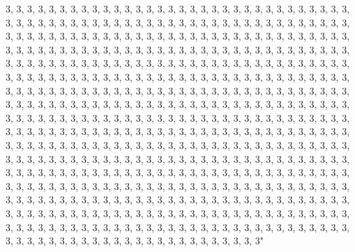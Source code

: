 \documentclass[
]{article}
\begin{document}
\begin{Schunk}
\begin{Soutput}
3, 3, 3, 3, 3, 3, 3, 3, 3, 3, 3, 3, 3, 3, 3, 3, 3, 3, 3, 3, 3, 3, 3, 3, 3, 3, 3, 3, 3, 3, 3, 3, 3, 3, 3, 3, 3, 3, 3, 3, 3, 3, 3, 3, 3, 3, 3, 3, 3, 3, 3, 3, 3, 3, 3, 3, 3, 3, 3, 3, 3, 3, 3, 3, 3, 3, 3, 3, 3, 3, 3, 3, 3, 3, 3, 3, 3, 3, 3, 3, 3, 3, 3, 3, 3, 3, 3, 3, 3, 3, 3, 3, 3, 3, 3, 3, 3, 3, 3, 3, 3, 3, 3, 3, 3, 3, 3, 3, 3, 3, 3, 3, 3, 3, 3, 3, 3, 3, 3, 3, 3, 3, 3, 3, 3, 3, 3, 3, 3, 3, 3, 3, 3, 3, 3, 3, 3, 3, 3, 3, 3, 3, 3, 3, 3, 3, 3, 3, 3, 3, 3, 3, 3, 3, 3, 3, 3, 3, 3, 3, 3, 3, 3, 3, 3, 3, 3, 3, 3, 3, 3, 3, 3, 3, 3, 3, 3, 3, 3, 3, 3, 3, 3, 3, 3, 3, 3, 3, 3, 3, 3, 3, 3, 3, 3, 3, 3, 3, 3, 3, 3, 3, 3, 3, 3, 3, 3, 3, 3, 3, 3, 3, 3, 3, 3, 3, 3, 3, 3, 3, 3, 3, 3, 3, 3, 3, 3, 3, 3, 3, 3, 3, 3, 3, 3, 3, 3, 3, 3, 3, 3, 3, 3, 3, 3, 3, 3, 3, 3, 3, 3, 3, 3, 3, 3, 3, 3, 3, 3, 3, 3, 3, 3, 3, 3, 3, 3, 3, 3, 3, 3, 3, 3, 3, 3, 3, 3, 3, 3, 3, 3, 3, 3, 3, 3, 3, 3, 3, 3, 3, 3, 3, 3, 3, 3, 3, 3, 3, 3, 3, 3, 3, 3, 3, 3, 3, 3, 3, 3, 3, 3, 3, 3, 3, 3, 3, 3, 3, 3, 3, 3, 3, 3, 3, 3, 3, 3, 3, 3, 3, 3, 3, 3, 3, 3, 3, 3, 3, 3, 3, 3, 3, 3, 3, 3, 3, 3, 3, 3, 3, 3, 3, 3, 3, 3, 3, 3, 3, 3, 3, 3, 3, 3, 3, 3, 3, 3, 3, 3, 3, 3, 3, 3, 3, 3, 3, 3, 3, 3, 3, 3, 3, 3, 3, 3, 3, 3, 3, 3, 3, 3, 3, 3, 3, 3, 3, 3, 3, 3, 3, 3, 3, 3, 3, 3, 3, 3, 3, 3, 3, 3, 3, 3, 3, 3, 3, 3, 3, 3, 3, 3, 3, 3, 3, 3, 3, 3, 3, 3, 3, 3, 3, 3, 3, 3, 3, 3, 3, 3, 3, 3, 3, 3, 3, 3, 3, 3, 3, 3, 3, 3, 3, 3, 3, 3, 3, 3, 3, 3, 3, 3, 3, 3, 3, 3, 3, 3, 3, 3, 3, 3, 3, 3, 3, 3, 3, 3, 3, 3, 3, 3, 3, 3, 3, 3, 3, 3, 3, 3, 3, 3, 3, 3, 3, 3, 3, 3, 3, 3, 3, 3, 3, 3, 3, 3, 3, 3, 3, 3, 3, 3, 3, 3, 3, 3, 3, 3, 3, 3, 3, 3, 3, 3, 3, 3, 3, 3, 3, 3, 3, 3, 3, 3, 3, 3, 3, 3, 3, 3, 3, 3, 3, 3, 3, 3, 3, 3, 3, 3, 3, 3, 3, 3, 3, 3, 3, 3, 3, 3, 3, 3, 3, 3, 3, 3, 3, 3, 3" 

\end{Soutput}
\end{Schunk}
\end{document}
